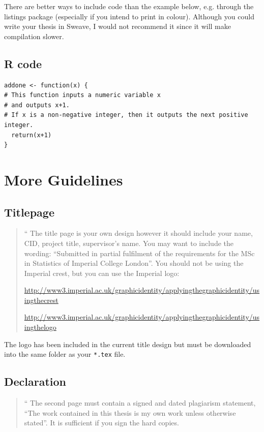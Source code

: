 \documentclass[11pt,a4,twosided,singlespacing,titlepagenumber=on]{scrreprt}
\numberwithin{equation}{chapter} %
\theoremstyle{remark}
\newenvironment{myquote}%
{\begin{quote}{\Large{}``}}%
{\ifhmode\unskip\fi{\Large{}''}\end{quote}}
\begin{document}
There are better ways to include code than the example below, e.g. through the listings package (especially if you intend to print in colour). 
Although you could write your thesis in Sweave, I would not recommend it since it will make compilation slower.
\section{R code}
\begin{verbatim}
addone <- function(x) {
# This function inputs a numeric variable x
# and outputs x+1.
# If x is a non-negative integer, then it outputs the next positive integer.
  return(x+1)
}
\end{verbatim}
\chapter{More Guidelines}
\section{Titlepage}
\begin{myquote}
The title page is your own design however it should include your name, CID, project title, supervisor's
name. You may want to include the wording: ``Submitted in partial fulfilment of the requirements for the
MSc in Statistics of Imperial College London''. You should not be using the Imperial crest, but you can use
the Imperial logo:

\url{http://www3.imperial.ac.uk/graphicidentity/applyingthegraphicidentity/usingthecrest}

\url{http://www3.imperial.ac.uk/graphicidentity/applyingthegraphicidentity/usingthelogo}
\end{myquote}
The logo has been included in the current title design but must be downloaded into the same folder as your \verb|*.tex| file.

\section{Declaration}
\begin{myquote}
The second page must contain a signed and dated plagiarism statement, ``The work contained
in this thesis is my own work unless otherwise stated''. It is sufficient if you sign the hard copies.
\end{myquote}
\end{document}
